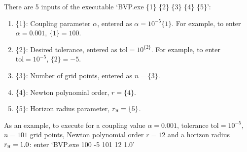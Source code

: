 \documentclass{article}
\newcommand{\Hz}{{\mbox{\tiny H}}}
\begin{document}
There are 5 inputs of the executable `BVP.exe \{1\} \{2\} \{3\} \{4\} \{5\}':
\begin{enumerate}
\item \{1\}: Coupling parameter $\alpha$, entered as $\alpha = 10^{-5} \{1\}$. For example, to enter $\alpha = 0.001$, $\{1\} = 100$.
\item \{2\}: Desired tolerance, entered as $\mathrm{tol} = 10^{\{2\}}$. For example, to enter $\mathrm{tol} = 10^{-5}$, $\{2\} = -5$.
\item \{3\}: Number of grid points, entered as $n = \{3\}$.
\item \{4\}: Newton polynomial order, $r = \{4\}$.
\item \{5\}: Horizon radius parameter, $r_{\Hz} = \{5\}$.
\end{enumerate}
As an example, to execute for a coupling value $\alpha = 0.001$, tolerance $\mathrm{tol} = 10^{-5}$, $n = 101$ grid points, Newton polynomial order $r = 12$ and a horizon radius $r_{\Hz} = 1.0$: enter `BVP.exe 100 -5 101 12 1.0'



\end{document}
